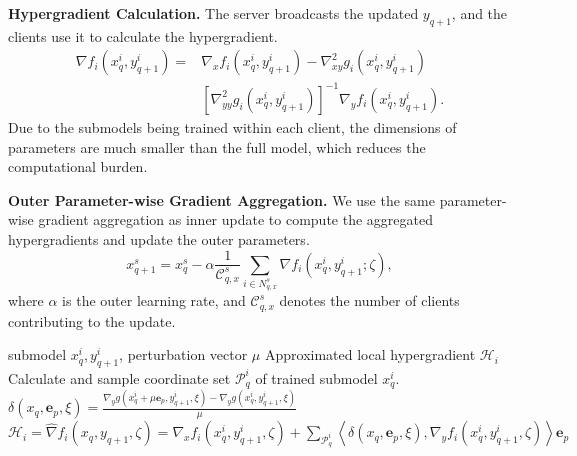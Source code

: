 \documentclass[lettersize,journal]{IEEEtran}
\begin{document}
\textbf{Hypergradient Calculation.} 
The server broadcasts the updated $y_{q+1}$, and the clients use it to calculate the hypergradient.
\begin{align}
\nabla f_i(x_q^i, y_{q+1}^i) = &\nabla_x f_i(x_q^i, y_{q+1}^i)- \nabla^2_{xy} g_i(x_q^i, y_{q+1}^i)\\
&[\nabla^2_{yy} g_i(x_q^i, y_{q+1}^i)]^{-1}\nabla_y f_i(x_q^i, y_{q+1}^i).\nonumber\label{surrogate_f}
\end{align}
Due to the submodels being trained within each client, 
the dimensions of parameters are much smaller than the full model, which reduces the computational burden. 

\textbf{Outer Parameter-wise Gradient Aggregation.} We use the same parameter-wise gradient aggregation as inner update to compute the aggregated hypergradients and update the outer parameters. 
\begin{equation}
 x_{q+1}^s = x_q^s - \alpha \frac{1}{\mathcal{C}_{q,x}^s} \sum_{i \in N_{q,x}^s} \nabla f_i(x_q^i, y_{q+1}^i; \zeta), 
\end{equation}
where \( \alpha \) is the outer learning rate, and \( \mathcal{C}_{q,x}^s \) denotes the number of clients contributing to the update.

\begin{algorithm}[t]
  \caption{\colorbox{cyan!30}{Second-Free Hypergradient Approximator}}
  \label{alg:approximation} 
  \begin{algorithmic}[1]
     submodel $x_q^i, y_{q+1}^i$, perturbation vector $\mu$
     Approximated local hypergradient $\mathcal{H}_i$
    \STATE Calculate and sample coordinate set $\mathcal{P}_{q}^i$ of trained submodel $x_q^i$.
    \STATE $\delta(x_q,\textbf{e}_p, \xi)=\frac{\nabla_y g(x_q^i+\mu\textbf{e}_p,y_{q+1}^i, \xi)-\nabla_y g(x_q^i,y_{q+1}^i, \xi)}{\mu}$
    \ENDFOR
    \STATE $\mathcal{H}_i=\hat{\nabla} f_i(x_q,y_{q+1}, \zeta)=\nabla_x f_i(x_q^i,y^i_{q+1}, \zeta)+\sum_{\mathcal{P}_{q}^i}\left \langle\delta(x_q,\textbf{e}_p, \xi),\nabla_yf_i(x_q^i,y^i_{q+1}, \zeta)\right \rangle \textbf{e}_p $
  \end{algorithmic}
\end{algorithm}
\end{document}
